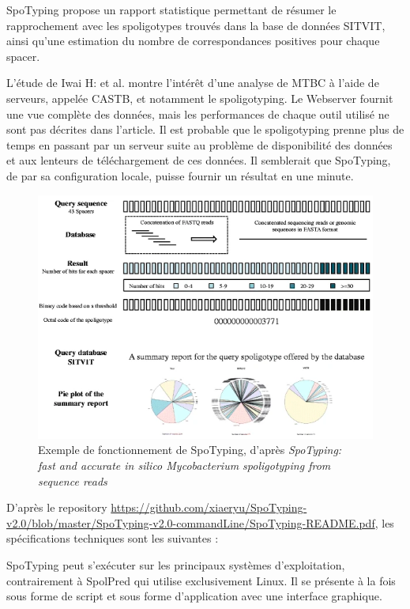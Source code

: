 \documentclass[twoside,a4paper,11pt,frenchb,openany]{report}
\begin{document}
SpoTyping propose un rapport statistique permettant de résumer le rapprochement avec les spoligotypes trouvés dans la base de données SITVIT, ainsi qu'une estimation du nombre de correspondances positives pour chaque spacer.

L'étude de Iwai H: et al. \cite{iwai} montre l'intérêt d'une analyse de MTBC à l'aide de serveurs, appelée CASTB, et notamment le spoligotyping. Le Webserver fournit une vue complète des données, mais les performances de chaque outil utilisé ne sont pas décrites dans l'article. Il est probable que le spoligotyping prenne plus de temps en passant par un serveur suite au problème de disponibilité des données et aux lenteurs de téléchargement de ces données. Il semblerait que SpoTyping, de par sa configuration locale, puisse fournir un résultat en une minute.

\begin{figure}
\includegraphics[scale=0.6]{spotyping.png}
\caption{Exemple de fonctionnement de SpoTyping, d'après \textit{SpoTyping:\\ fast and accurate in silico Mycobacterium spoligotyping from sequence reads}}
\end{figure}

D'après le repository \url{https://github.com/xiaeryu/SpoTyping-v2.0/blob/master/SpoTyping-v2.0-commandLine/SpoTyping-README.pdf}, les spécifications techniques sont les suivantes :

SpoTyping peut s'exécuter sur les principaux systèmes d'exploitation, contrairement à SpolPred qui utilise exclusivement Linux. Il se présente à la fois sous forme de script et sous forme d'application avec une interface graphique.
\end{document}
